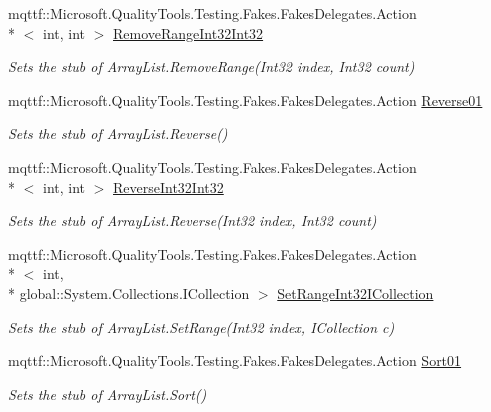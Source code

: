 \begin{DoxyCompactItemize}
mqttf\-::\-Microsoft.\-Quality\-Tools.\-Testing.\-Fakes.\-Fakes\-Delegates.\-Action\\*
$<$ int, int $>$ \hyperlink{class_system_1_1_collections_1_1_fakes_1_1_stub_array_list_a65cf71eb12bf0c7185a1b27413313444}{Remove\-Range\-Int32\-Int32}
\begin{DoxyCompactList}\small\item\em Sets the stub of Array\-List.\-Remove\-Range(\-Int32 index, Int32 count)\end{DoxyCompactList}\item 
mqttf\-::\-Microsoft.\-Quality\-Tools.\-Testing.\-Fakes.\-Fakes\-Delegates.\-Action \hyperlink{class_system_1_1_collections_1_1_fakes_1_1_stub_array_list_add09ad49398ffcd153a67aad9708e7b5}{Reverse01}
\begin{DoxyCompactList}\small\item\em Sets the stub of Array\-List.\-Reverse()\end{DoxyCompactList}\item 
mqttf\-::\-Microsoft.\-Quality\-Tools.\-Testing.\-Fakes.\-Fakes\-Delegates.\-Action\\*
$<$ int, int $>$ \hyperlink{class_system_1_1_collections_1_1_fakes_1_1_stub_array_list_a96c338bafe89f85b3406b7d7c64b72df}{Reverse\-Int32\-Int32}
\begin{DoxyCompactList}\small\item\em Sets the stub of Array\-List.\-Reverse(\-Int32 index, Int32 count)\end{DoxyCompactList}\item 
mqttf\-::\-Microsoft.\-Quality\-Tools.\-Testing.\-Fakes.\-Fakes\-Delegates.\-Action\\*
$<$ int, \\*
global\-::\-System.\-Collections.\-I\-Collection $>$ \hyperlink{class_system_1_1_collections_1_1_fakes_1_1_stub_array_list_a69e054ef0e91407c9eff367394f1d0b8}{Set\-Range\-Int32\-I\-Collection}
\begin{DoxyCompactList}\small\item\em Sets the stub of Array\-List.\-Set\-Range(\-Int32 index, I\-Collection c)\end{DoxyCompactList}\item 
mqttf\-::\-Microsoft.\-Quality\-Tools.\-Testing.\-Fakes.\-Fakes\-Delegates.\-Action \hyperlink{class_system_1_1_collections_1_1_fakes_1_1_stub_array_list_a0b5e9bba4b49d8bd4e1711e6ba5d9ecb}{Sort01}
\begin{DoxyCompactList}\small\item\em Sets the stub of Array\-List.\-Sort()\end{DoxyCompactList}\item 

\end{DoxyCompactItemize}
